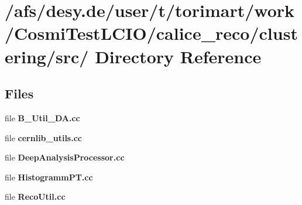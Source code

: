 \section{/afs/desy.de/user/t/torimart/work/CosmiTestLCIO/calice\_\-reco/clustering/src/ Directory Reference}
\label{dir_0a8ebc297fa2fc60b7a5a0c36223d55c}
\subsection*{Files}
\begin{DoxyCompactItemize}
\item 
file {\bfseries B\_\-Util\_\-DA.cc}
\item 
file {\bfseries cernlib\_\-utils.cc}
\item 
file {\bfseries DeepAnalysisProcessor.cc}
\item 
file {\bfseries HistogrammPT.cc}
\item 
file {\bfseries RecoUtil.cc}
\end{DoxyCompactItemize}
